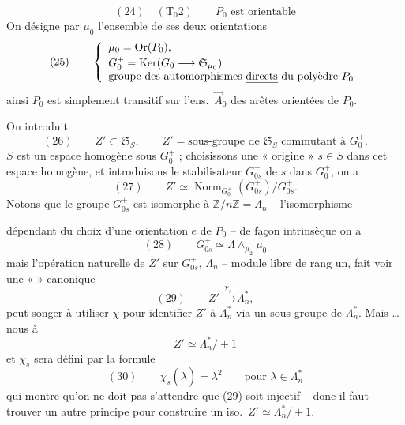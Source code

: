 \documentclass[11pt,a4paper]{article}
\begin{document}
\[
(24) \quad (\text{T}_0 2) \qquad P_0 \text{ est orientable}
\]
On désigne par $\mu_0$ l'ensemble de ses deux orientations
\[
(25) \qquad
\left\{
\begin{array}{l}
\mu_0 = \operatorname{Or}(P_0) , \\[2pt]
G_0^{+} = \operatorname{Ker}(G_0 \longrightarrow \mathfrak{S}_{\mu_0}) \\
\text{groupe des automorphismes \emph{directs} du polyèdre } P_0
\end{array}
\right.
\]
ainsi $P_0$ est simplement transitif sur l'ens.\ $\vec A_0$ des arêtes orientées de $P_0$.

On introduit
\[
(26) \qquad Z' \subset \mathfrak{S}_S, \qquad Z' = \text{sous-groupe de } \mathfrak{S}_S \text{ commutant à } G_0^{+} .
\]
$S$ est un espace homogène sous $G_0^{+}$ ; choisissons une « origine » $s \in S$ dans cet espace homogène, et introduisons le stabilisateur $G_{0s}^{+}$ de $s$ dans $G_0^{+}$, on a
\[
(27) \qquad Z' \simeq \operatorname{Norm}_{G_0^{+}}(G_{0s}^{+}) / G_{0s}^{+} .
\]
 Notons  que le groupe $G_{0s}^{+}$ est isomorphe à $\mathbb{Z}/n\mathbb{Z} = \Lambda_n$ \struck{\ill{}} -- l'isomorphisme


dépendant du choix d'une orientation $e$ de $P_0$ -- de façon intrinsèque on a
\[
(28) \qquad G_{0s}^{+} \simeq \Lambda \wedge_{\mu_2} \mu_0
\]
mais l'opération naturelle de $Z'$ sur $G_{0s}^{+}$, \struck{\ill{}} $\Lambda_n$ -- module libre de rang un, fait voir une «  » canonique
\[
(29) \qquad Z' \xrightarrow{\ \chi_s\ } \Lambda_n^{*} ,
\]
 peut songer à utiliser $\chi$ pour identifier $Z'$ à $\Lambda_n^{*}$ via un sous-groupe de $\Lambda_n^{*}$. Mais  \ill{} \ill{} \ill{}… nous  à
\[
Z' \simeq \Lambda_n^{*} / \pm 1
\]
et $\chi_s$ sera défini par la formule
\[
(30) \qquad \chi_s(\dot\lambda) = \lambda^2 \qquad \text{pour } \lambda \in \Lambda_n^{*}
\]
qui montre qu'on ne doit pas s'attendre que (29) soit injectif -- donc il faut trouver un autre principe pour construire un iso.\ $Z' \simeq \Lambda_n^{*} / \pm 1$.
\end{document}
